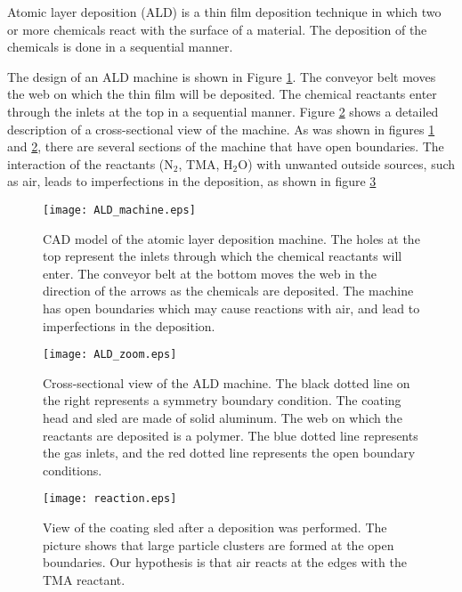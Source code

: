 

Atomic layer deposition (ALD) is a thin film deposition technique in which two or more chemicals react with the surface of a material. The deposition of the chemicals is done in a sequential manner.

The design of an ALD machine is shown in Figure \ref{fig:ALD_machine}. The conveyor belt moves the web on which the thin film will be deposited. The chemical reactants enter through the inlets at the top in a sequential manner. Figure \ref{fig:ALD_zoom} shows a detailed description of a cross-sectional view of the machine. As was shown in figures \ref{fig:ALD_machine} and \ref{fig:ALD_zoom}, there are several sections of the machine that have open boundaries. The interaction of the reactants ($\mathrm{N}_{2}$, $\mathrm{TMA}$, $\mathrm{H}_{2}\mathrm{O}$) with unwanted outside sources, such as air, leads to imperfections in the deposition, as shown in figure \ref{fig:reaction}
%
\begin{figure}
	\centering
	\texttt{[image: ALD\_machine.eps]}
	\caption{CAD model of the atomic layer deposition machine. The holes at the top represent the inlets through which the chemical reactants will enter. The conveyor belt at the bottom moves the web in the direction of the arrows as the chemicals are deposited. The machine has open boundaries which may cause reactions with air, and lead to imperfections in the deposition.}
	\label{fig:ALD_machine}
\end{figure}
%
\begin{figure}
	\centering
	\texttt{[image: ALD\_zoom.eps]}
	\caption{Cross-sectional view of the ALD machine. The black dotted line on the right represents a symmetry boundary condition. The coating head and sled are made of solid aluminum. The web on which the reactants are deposited is a polymer. The blue dotted line represents the gas inlets, and the red dotted line represents the open boundary conditions.}
	\label{fig:ALD_zoom}
\end{figure}
%
\begin{figure}
	\centering
	\texttt{[image: reaction.eps]}
	\caption{View of the coating sled after a deposition was performed. The picture shows that large particle clusters are formed at the open boundaries. Our hypothesis is that air reacts at the edges with the $\mathrm{TMA}$ reactant.}
	\label{fig:reaction}
\end{figure}

